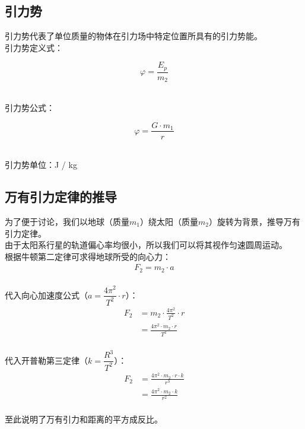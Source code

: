 \documentclass[UTF8]{ctexart}
\begin{document}
\newpage

\subsection{引力势}
    引力势代表了单位质量的物体在引力场中特定位置所具有的引力势能。\\[3mm]
    引力势定义式：\vspace{3pt}
    \begin{large}
        \begin{equation*}
            \varphi=\frac{E_p}{m_2}
        \end{equation*}
    \end{large}\\
    引力势公式：\vspace{3pt}
    \begin{large}
        \begin{equation*}
            \varphi=\frac{G\cdot m_{1}}{r}
        \end{equation*}
    \end{large}\\
    引力势单位：J / kg\\

\subsection{万有引力定律的推导}
    为了便于讨论，我们以地球（质量$m_1$）绕太阳（质量$m_2$）旋转为背景，推导万有引力定律。\\[3mm]
    由于太阳系行星的轨道偏心率均很小，所以我们可以将其视作匀速圆周运动。\\[5mm]
    根据牛顿第二定律可求得地球所受的向心力：
    \setcounter{equation}{0}
    \begin{align}
        F_2=m_2\cdot a
    \end{align}\\
    代入向心加速度公式（$a=\dfrac{4\pi^2}{T^2}\cdot r$）：
    \begin{align}
        F_2
        &=m_2\cdot\frac{4\pi^2}{T^2}\cdot r\\[3mm]
        &=\frac{4\pi^2\cdot m_2\cdot r}{T^2}
    \end{align}\\
    代入开普勒第三定律（$k=\dfrac{R^3}{T^2}$）：
    \begin{align}
        F_2
        &=\frac{4\pi^2\cdot m_2\cdot r\cdot k}{r^3}\\[3mm]
        &=\frac{4\pi^2\cdot m_2\cdot k}{r^2}
    \end{align}\\
    至此说明了万有引力和距离的平方成反比。
\end{document}
